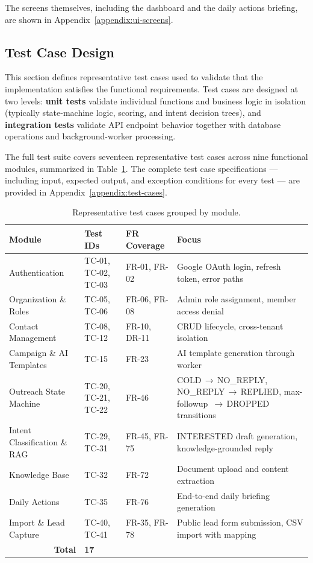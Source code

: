 \documentclass[a4paper]{article}
\begin{document}
The screens themselves, including the dashboard and the daily actions
briefing, are shown in Appendix~\ref{appendix:ui-screens}.


\subsection{Test Case Design}
\label{sec:test-design}

This section defines representative test cases used to validate
that the implementation satisfies the functional requirements.
Test cases are designed at two levels: \textbf{unit tests}
validate individual functions and business logic in isolation
(typically state-machine logic, scoring, and intent decision
trees), and \textbf{integration tests} validate API endpoint
behavior together with database operations and background-worker
processing.

The full test suite covers seventeen representative test cases
across nine functional modules, summarized in
Table~\ref{tab:test-summary}. The complete test case specifications
--- including input, expected output, and exception conditions for
every test --- are provided in
Appendix~\ref{appendix:test-cases}.

\begin{table}[H]
\centering
\caption{Representative test cases grouped by module.}
\label{tab:test-summary}
\small
\begin{tabular}{|p{3.6cm}|p{2.5cm}|p{2.5cm}|p{4.4cm}|}
\hline
\textbf{Module} & \textbf{Test IDs} & \textbf{FR Coverage} &
\textbf{Focus} \\
\hline
Authentication & TC-01, TC-02, TC-03 & FR-01, FR-02 &
Google OAuth login, refresh token, error paths \\
\hline
Organization \& Roles & TC-05, TC-06 & FR-06, FR-08 &
Admin role assignment, member access denial \\
\hline
Contact Management & TC-08, TC-12 & FR-10, DR-11 &
CRUD lifecycle, cross-tenant isolation \\
\hline
Campaign \& AI Templates & TC-15 & FR-23 &
AI template generation through worker \\
\hline
Outreach State Machine & TC-20, TC-21, TC-22 & FR-46 &
COLD\,$\rightarrow$\,NO\_REPLY,
NO\_REPLY\,$\rightarrow$\,REPLIED, max-followup
\,$\rightarrow$\,DROPPED transitions \\
\hline
Intent Classification \& RAG & TC-29, TC-31 & FR-45, FR-75 &
INTERESTED draft generation, knowledge-grounded reply \\
\hline
Knowledge Base & TC-32 & FR-72 &
Document upload and content extraction \\
\hline
Daily Actions & TC-35 & FR-76 &
End-to-end daily briefing generation \\
\hline
Import \& Lead Capture & TC-40, TC-41 & FR-35, FR-78 &
Public lead form submission, CSV import with mapping \\
\hline
\multicolumn{1}{|r|}{\textbf{Total}} & \textbf{17} &
\multicolumn{2}{l|}{} \\
\hline
\end{tabular}
\end{table}
\end{document}
